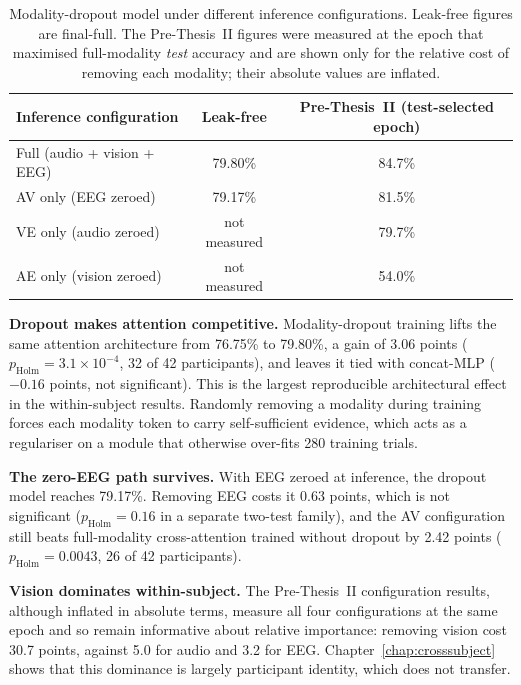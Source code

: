 \begin{table}[htbp]
\centering
\small
\caption{Modality-dropout model under different inference configurations. Leak-free figures are final-full. The Pre-Thesis~II figures were measured at the epoch that maximised full-modality \emph{test} accuracy and are shown only for the relative cost of removing each modality; their absolute values are inflated.}
\label{tab:robustness}
\begin{tabular}{lcc}
\hline
\textbf{Inference configuration} & \textbf{Leak-free} & \textbf{Pre-Thesis~II (test-selected epoch)} \\
\hline
Full (audio + vision + EEG) & 79.80\% & 84.7\% \\
AV only (EEG zeroed) & 79.17\% & 81.5\% \\
VE only (audio zeroed) & not measured & 79.7\% \\
AE only (vision zeroed) & not measured & 54.0\% \\
\hline
\end{tabular}
\end{table}

\textbf{Dropout makes attention competitive.} Modality-dropout training lifts the same attention architecture from 76.75\% to 79.80\%, a gain of 3.06 points ($p_{\mathrm{Holm}} = 3.1\times10^{-4}$, 32 of 42 participants), and leaves it tied with concat-MLP ($-0.16$ points, not significant). This is the largest reproducible architectural effect in the within-subject results. Randomly removing a modality during training forces each modality token to carry self-sufficient evidence, which acts as a regulariser on a module that otherwise over-fits 280 training trials.

\textbf{The zero-EEG path survives.} With EEG zeroed at inference, the dropout model reaches 79.17\%. Removing EEG costs it 0.63 points, which is not significant ($p_{\mathrm{Holm}} = 0.16$ in a separate two-test family), and the AV configuration still beats full-modality cross-attention trained without dropout by 2.42 points ($p_{\mathrm{Holm}} = 0.0043$, 26 of 42 participants).

\textbf{Vision dominates within-subject.} The Pre-Thesis~II configuration results, although inflated in absolute terms, measure all four configurations at the same epoch and so remain informative about relative importance: removing vision cost 30.7 points, against 5.0 for audio and 3.2 for EEG. Chapter~\ref{chap:crosssubject} shows that this dominance is largely participant identity, which does not transfer.

